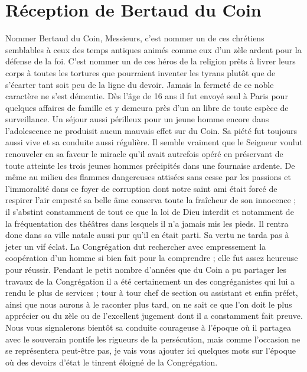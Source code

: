 \section*{Réception de Bertaud du Coin}
Nommer Bertaud du Coin, Messieurs, c'est nommer un de ces chrétiens semblables à ceux des temps antiques animés comme eux d'un zèle ardent pour la défense de la foi. C'est nommer un de ces héros de la religion prêts à livrer leurs corps à toutes les tortures que pourraient inventer les tyrans plutôt que de s'écarter tant soit peu de la ligne du devoir. Jamais la fermeté de ce noble caractère ne s'est démentie. Dès l'âge de 16 ans il fut envoyé seul à Paris pour quelques affaires de famille et y demeura près d'un an libre de toute espèce de surveillance. Un séjour aussi périlleux pour un jeune homme encore dans l'adolescence ne produisit aucun mauvais effet sur du Coin. Sa piété fut toujours aussi vive et sa conduite aussi régulière. Il semble vraiment que le Seigneur voulut renouveler en sa faveur le miracle qu'il avait autrefois opéré en préservant de toute atteinte les trois jeunes hommes précipités dans une fournaise ardente. De même au milieu des flammes dangereuses attisées sans cesse par les passions et l'immoralité dans ce foyer de corruption dont notre saint ami était forcé de respirer l'air empesté sa belle âme conserva toute la fraîcheur de son innocence ; il s'abstint constamment de tout ce que la loi de Dieu interdit et notamment de la fréquentation des théâtres dans lesquels il n'a jamais mis les pieds. Il rentra donc dans
sa ville natale aussi pur qu'il en était parti. Sa vertu ne tarda pas à jeter un vif éclat. La Congrégation dut rechercher avec empressement la coopération d'un homme si bien fait pour la comprendre ; elle fut assez heureuse pour réussir. Pendant le petit nombre d'années que du Coin a pu partager les travaux de la Congrégation il a été certainement un des congréganistes qui lui a rendu le plus de services ; tour à tour chef de section ou assistant et enfin préfet, ainsi que nous aurons à le raconter plus tard, on ne sait ce que l'on doit le plus apprécier ou du zèle ou de l'excellent jugement dont il a constamment fait preuve. Nous vous signalerons bientôt sa conduite courageuse à l'époque où il partagea avec le souverain pontife les rigueurs de la persécution, mais comme l'occasion ne se représentera peut-être pas, je vais vous ajouter ici quelques mots sur l'époque où des devoirs d'état le tinrent éloigné de la Congrégation.

